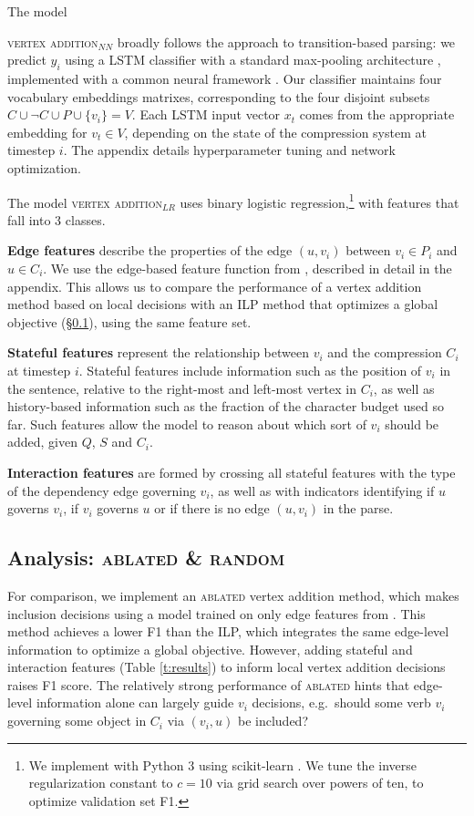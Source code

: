 \documentclass[11pt,a4paper]{article}
\begin{document}
The model {\textsc{vertex addition}$_{NN}$ broadly follows the \citet{D14-1082} approach to transition-based parsing: we predict $y_i$ using a LSTM classifier with a standard max-pooling architecture \cite{D17-1070}, implemented with a common neural framework \cite{Gardner2017AllenNLP}. Our classifier maintains four vocabulary embeddings matrixes, corresponding to the four disjoint subsets $C \cup \neg C \cup P \cup \{v_i\} = V$. Each LSTM input vector $x_t$ comes from the appropriate embedding for $v_t \in V$, depending on the state of the compression system at timestep $i$. The appendix details hyperparameter tuning and network optimization.

The model \textsc{vertex addition}$_{LR}$ uses binary logistic regression,\footnote{We implement with Python 3 using scikit-learn \cite{Pedregosa:2011:SML:1953048.2078195}. We tune the inverse regularization constant to $c=10$ via grid search over powers of ten, to optimize validation set F1.} with features that fall into 3 classes.

\textbf{Edge features} describe the properties of the edge $(u,v_i)$ between $v_i \in P_i$ and $u \in C_i$. We use the edge-based feature function from \citet{filippova2013overcoming}, described in detail in the appendix. This allows us to compare the performance of a vertex addition method based on local decisions with an ILP method that optimizes a global objective (\S \ref{s:ablated}), using the same feature set.

\textbf{Stateful features} represent the relationship between $v_i$ and the compression $C_i$ at timestep $i$. Stateful features include information such as the position of $v_i$ in the sentence, relative to the right-most and left-most vertex in $C_i$, as well as history-based information such as the fraction of the character budget used so far. Such features allow the model to reason about which sort of $v_i$ should be added, given $Q$, $S$ and $C_i$.

\textbf{Interaction features} are formed by crossing all stateful features with the type of the dependency edge governing $v_i$, as well as with indicators identifying if $u$ governs $v_i$, if $v_i$ governs $u$ or if there is no edge $(u,v_i)$ in the parse.

\subsection{Analysis:  \textsc{ablated} \& \textsc{random}}\label{s:ablated}
For comparison, we implement an \textsc{ablated} vertex addition method, which makes inclusion decisions using a model trained on only edge features from \citet{filippova2013overcoming}. This method achieves a lower F1 than the ILP, which integrates the same edge-level information to optimize a global objective. However, adding stateful and interaction features (Table \ref{t:results}) to inform local vertex addition decisions raises F1 score. The relatively strong performance of \textsc{ablated} hints that edge-level information alone can largely guide $v_i$ decisions, e.g.\ should some verb $v_i$ governing some object in $C_i$ via $(v_i,u)$ be included?

}
\end{document}

